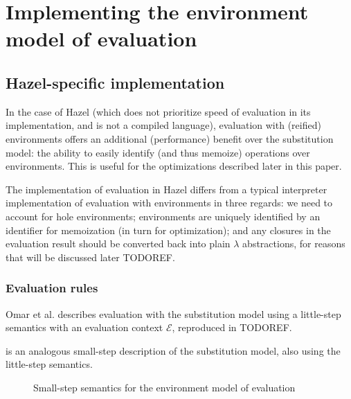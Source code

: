 \section{Implementing the environment model of evaluation}
\label{sec:env_model_evaluation}

\subsection{Hazel-specific implementation}
\label{sec:eval_with_envs}

In the case of Hazel (which does not prioritize speed of evaluation in its implementation, and is not a compiled language), evaluation with (reified) environments offers an additional (performance) benefit over the substitution model: the ability to easily identify (and thus memoize) operations over environments. This is useful for the optimizations described later in this paper.

The implementation of evaluation in Hazel differs from a typical interpreter implementation of evaluation with environments in three regards: we need to account for hole environments; environments are uniquely identified by an identifier for memoization (in turn for optimization); and any closures in the evaluation result should be converted back into plain $\lambda$ abstractions, for reasons that will be discussed later TODOREF.


\subsubsection{Evaluation rules}
\label{sec:evalenv-rules}

Omar et al. \cite{conf/popl/HazelnutLive19} describes evaluation with the substitution model using a little-step semantics with an evaluation context $\mathcal{E}$, reproduced in TODOREF.


 is an analogous small-step description of the substitution model, also using the little-step semantics.

\begin{figure}
  \centering
  \begin{mdframed}
    \begin{singlespace}
      
    \end{singlespace}
  \end{mdframed}
  \caption{Small-step semantics for the environment model of evaluation}
  \label{fig:small-step-formal}
\end{figure}


